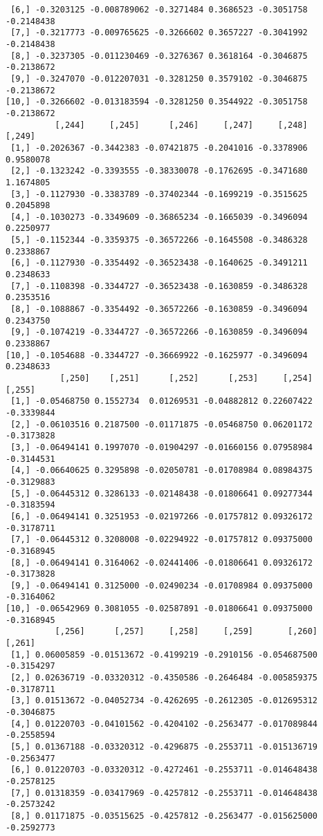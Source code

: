 \documentclass[
  letterpaper,
  DIV=11,
  numbers=noendperiod]{scrreprt}
\begin{document}
\begin{verbatim}
 [6,] -0.3203125 -0.008789062 -0.3271484 0.3686523 -0.3051758 -0.2148438
 [7,] -0.3217773 -0.009765625 -0.3266602 0.3657227 -0.3041992 -0.2148438
 [8,] -0.3237305 -0.011230469 -0.3276367 0.3618164 -0.3046875 -0.2138672
 [9,] -0.3247070 -0.012207031 -0.3281250 0.3579102 -0.3046875 -0.2138672
[10,] -0.3266602 -0.013183594 -0.3281250 0.3544922 -0.3051758 -0.2138672
          [,244]     [,245]      [,246]     [,247]     [,248]    [,249]
 [1,] -0.2026367 -0.3442383 -0.07421875 -0.2041016 -0.3378906 0.9580078
 [2,] -0.1323242 -0.3393555 -0.38330078 -0.1762695 -0.3471680 1.1674805
 [3,] -0.1127930 -0.3383789 -0.37402344 -0.1699219 -0.3515625 0.2045898
 [4,] -0.1030273 -0.3349609 -0.36865234 -0.1665039 -0.3496094 0.2250977
 [5,] -0.1152344 -0.3359375 -0.36572266 -0.1645508 -0.3486328 0.2338867
 [6,] -0.1127930 -0.3354492 -0.36523438 -0.1640625 -0.3491211 0.2348633
 [7,] -0.1108398 -0.3344727 -0.36523438 -0.1630859 -0.3486328 0.2353516
 [8,] -0.1088867 -0.3354492 -0.36572266 -0.1630859 -0.3496094 0.2343750
 [9,] -0.1074219 -0.3344727 -0.36572266 -0.1630859 -0.3496094 0.2338867
[10,] -0.1054688 -0.3344727 -0.36669922 -0.1625977 -0.3496094 0.2348633
           [,250]    [,251]      [,252]      [,253]     [,254]     [,255]
 [1,] -0.05468750 0.1552734  0.01269531 -0.04882812 0.22607422 -0.3339844
 [2,] -0.06103516 0.2187500 -0.01171875 -0.05468750 0.06201172 -0.3173828
 [3,] -0.06494141 0.1997070 -0.01904297 -0.01660156 0.07958984 -0.3144531
 [4,] -0.06640625 0.3295898 -0.02050781 -0.01708984 0.08984375 -0.3129883
 [5,] -0.06445312 0.3286133 -0.02148438 -0.01806641 0.09277344 -0.3183594
 [6,] -0.06494141 0.3251953 -0.02197266 -0.01757812 0.09326172 -0.3178711
 [7,] -0.06445312 0.3208008 -0.02294922 -0.01757812 0.09375000 -0.3168945
 [8,] -0.06494141 0.3164062 -0.02441406 -0.01806641 0.09326172 -0.3173828
 [9,] -0.06494141 0.3125000 -0.02490234 -0.01708984 0.09375000 -0.3164062
[10,] -0.06542969 0.3081055 -0.02587891 -0.01806641 0.09375000 -0.3168945
          [,256]      [,257]     [,258]     [,259]       [,260]     [,261]
 [1,] 0.06005859 -0.01513672 -0.4199219 -0.2910156 -0.054687500 -0.3154297
 [2,] 0.02636719 -0.03320312 -0.4350586 -0.2646484 -0.005859375 -0.3178711
 [3,] 0.01513672 -0.04052734 -0.4262695 -0.2612305 -0.012695312 -0.3046875
 [4,] 0.01220703 -0.04101562 -0.4204102 -0.2563477 -0.017089844 -0.2558594
 [5,] 0.01367188 -0.03320312 -0.4296875 -0.2553711 -0.015136719 -0.2563477
 [6,] 0.01220703 -0.03320312 -0.4272461 -0.2553711 -0.014648438 -0.2578125
 [7,] 0.01318359 -0.03417969 -0.4257812 -0.2553711 -0.014648438 -0.2573242
 [8,] 0.01171875 -0.03515625 -0.4257812 -0.2563477 -0.015625000 -0.2592773

\end{verbatim}
\end{document}
